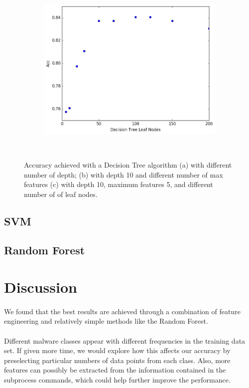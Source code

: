 \documentclass[11pt]{article}
\begin{document}
\begin{figure}[]
\begin{subfigure}[!t]{0.3\textwidth}
        \includegraphics[width=\textwidth]{Plots/DT_leafnodes.png}
    \end{subfigure}\\
        \caption{Accuracy achieved with a Decision Tree algorithm (a) with different number of depth; (b) with depth 10 and different number of max features (c)  with depth 10, maximum features 5, and different number of of leaf nodes.}
            \label{fig:DT}
\end{figure}


\subsection{SVM}
\subsection{Random Forest}


\section{Discussion} 
\paragraph{}We found that the best results are achieved through a combination of feature engineering and relatively simple methods like the Random Forest.

\paragraph{}Different malware classes appear with different frequencies in the training data set. If given more time, we would explore how this affects our accuracy by preselecting particular numbers of data points from each class. Also, more features can possibly be extracted from the information contained in the subprocess commands, which could help further improve the performance. 
\end{document}

